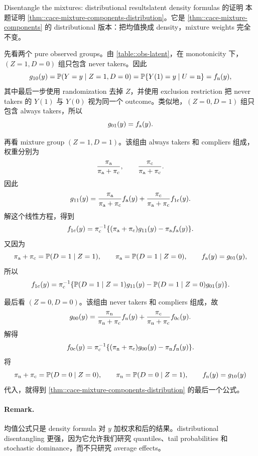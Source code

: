 \begin{exercisesolution}{Disentangle the mixtures: distributional results}{latent density formulas 的证明}
本题证明 \cref{thm::cace-mixture-components-distribution}。它是 \cref{thm::cace-mixture-components} 的 distributional 版本：把均值换成 density，mixture weights 完全不变。

先看两个 pure observed groups。由 \cref{table::obs-latent}，在 monotonicity 下，$(Z=1,D=0)$ 组只包含 never takers。因此
\[
g_{10}(y)
=
\mathbb{P}(Y=y\mid Z=1,D=0)
=
\mathbb{P}\{Y(1)=y\mid U=\textup{n}\}
=f_{\textup{n}}(y),
\]
其中最后一步使用 randomization 去掉 $Z$，并使用 exclusion restriction 把 never takers 的 $Y(1)$ 与 $Y(0)$ 视为同一个 outcome。类似地，$(Z=0,D=1)$ 组只包含 always takers，所以
\[
g_{01}(y)=f_{\textup{a}}(y).
\]

再看 mixture group $(Z=1,D=1)$。该组由 always takers 和 compliers 组成，权重分别为
\[
\frac{\pi_{\textup{a}}}{\pi_{\textup{a}}+\pi_{\textup{c}}},
\qquad
\frac{\pi_{\textup{c}}}{\pi_{\textup{a}}+\pi_{\textup{c}}}.
\]
因此
\[
g_{11}(y)
=
\frac{\pi_{\textup{a}}}{\pi_{\textup{a}}+\pi_{\textup{c}}}f_{\textup{a}}(y)
+
\frac{\pi_{\textup{c}}}{\pi_{\textup{a}}+\pi_{\textup{c}}}f_{1\textup{c}}(y).
\]
解这个线性方程，得到
\[
f_{1\textup{c}}(y)
=
\pi_{\textup{c}}^{-1}\{(\pi_{\textup{a}}+\pi_{\textup{c}})g_{11}(y)-\pi_{\textup{a}} f_{\textup{a}}(y)\}.
\]
又因为
\[
\pi_{\textup{a}}+\pi_{\textup{c}}=\mathbb{P}(D=1\mid Z=1),
\qquad
\pi_{\textup{a}}=\mathbb{P}(D=1\mid Z=0),
\qquad
f_{\textup{a}}(y)=g_{01}(y),
\]
所以
\[
f_{1\textup{c}}(y)
=
\pi_{\textup{c}}^{-1}\{\mathbb{P}(D=1\mid Z=1)g_{11}(y)
-\mathbb{P}(D=1\mid Z=0)g_{01}(y)\}.
\]

最后看 $(Z=0,D=0)$。该组由 never takers 和 compliers 组成，故
\[
g_{00}(y)
=
\frac{\pi_{\textup{n}}}{\pi_{\textup{n}}+\pi_{\textup{c}}}f_{\textup{n}}(y)
+
\frac{\pi_{\textup{c}}}{\pi_{\textup{n}}+\pi_{\textup{c}}}f_{0\textup{c}}(y).
\]
解得
\[
f_{0\textup{c}}(y)
=
\pi_{\textup{c}}^{-1}\{(\pi_{\textup{n}}+\pi_{\textup{c}})g_{00}(y)-\pi_{\textup{n}} f_{\textup{n}}(y)\}.
\]
将
\[
\pi_{\textup{n}}+\pi_{\textup{c}}=\mathbb{P}(D=0\mid Z=0),
\qquad
\pi_{\textup{n}}=\mathbb{P}(D=0\mid Z=1),
\qquad
f_{\textup{n}}(y)=g_{10}(y)
\]
代入，就得到 \cref{thm::cace-mixture-components-distribution} 的最后一个公式。

\paragraph{Remark.}
均值公式只是 density formula 对 $y$ 加权求和后的结果。distributional disentangling 更强，因为它允许我们研究 quantiles、tail probabilities 和 stochastic dominance，而不只研究 average effects。
\end{exercisesolution}

